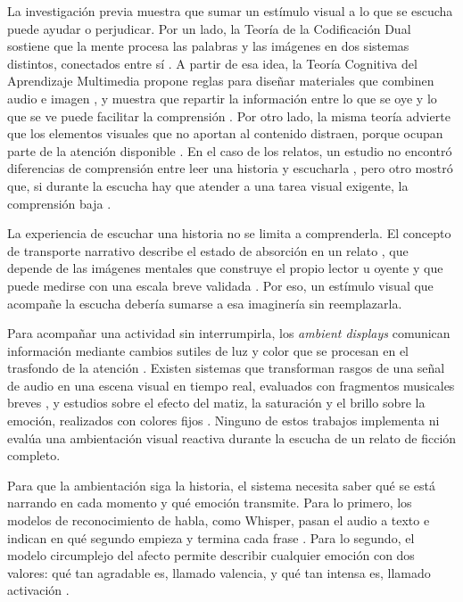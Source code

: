 \documentclass[journal]{IEEEtran}
\begin{document}
La investigación previa muestra que sumar un estímulo visual a lo que se escucha puede ayudar o perjudicar. Por un lado, la Teoría de la Codificación Dual sostiene que la mente procesa las palabras y las imágenes en dos sistemas distintos, conectados entre sí \cite{paivio1986, paivio1991}. A partir de esa idea, la Teoría Cognitiva del Aprendizaje Multimedia propone reglas para diseñar materiales que combinen audio e imagen \cite{mayer2009, mayer2024}, y muestra que repartir la información entre lo que se oye y lo que se ve puede facilitar la comprensión \cite{mousavi1995}. Por otro lado, la misma teoría advierte que los elementos visuales que no aportan al contenido distraen, porque ocupan parte de la atención disponible \cite{mayermoreno2003}. En el caso de los relatos, un estudio no encontró diferencias de comprensión entre leer una historia y escucharla \cite{rogowsky2016}, pero otro mostró que, si durante la escucha hay que atender a una tarea visual exigente, la comprensión baja \cite{xie2023}.

La experiencia de escuchar una historia no se limita a comprenderla. El concepto de transporte narrativo describe el estado de absorción en un relato \cite{greenbrock2000}, que depende de las imágenes mentales que construye el propio lector u oyente \cite{greenbrock2002} y que puede medirse con una escala breve validada \cite{appel2015}. Por eso, un estímulo visual que acompañe la escucha debería sumarse a esa imaginería sin reemplazarla.

Para acompañar una actividad sin interrumpirla, los \textit{ambient displays} comunican información mediante cambios sutiles de luz y color que se procesan en el trasfondo de la atención \cite{wisneski1998}. Existen sistemas que transforman rasgos de una señal de audio en una escena visual en tiempo real, evaluados con fragmentos musicales breves \cite{graf2021}, y estudios sobre el efecto del matiz, la saturación y el brillo sobre la emoción, realizados con colores fijos \cite{wilmsoberfeld2018}. Ninguno de estos trabajos implementa ni evalúa una ambientación visual reactiva durante la escucha de un relato de ficción completo.

Para que la ambientación siga la historia, el sistema necesita saber qué se está narrando en cada momento y qué emoción transmite. Para lo primero, los modelos de reconocimiento de habla, como Whisper, pasan el audio a texto e indican en qué segundo empieza y termina cada frase \cite{radford2023}. Para lo segundo, el modelo circumplejo del afecto permite describir cualquier emoción con dos valores: qué tan agradable es, llamado valencia, y qué tan intensa es, llamado activación \cite{russell1980}.
\end{document}
